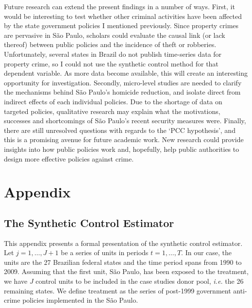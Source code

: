 Future research can extend the present findings in a number of ways. First, it would be interesting to test whether other criminal activities have been affected by the state government policies I mentioned previously. Since property crimes are pervasive in São Paulo, scholars could evaluate the causal link (or lack thereof) between public policies and the incidence of theft or robberies. Unfortunately, several states in Brazil do not publish time-series data for property crime, so I could not use the synthetic control method for that dependent variable. As more data become available, this will create an interesting opportunity for investigation. Secondly, micro-level studies are needed to clarify the mechanisms behind São Paulo's homicide reduction, and isolate direct from indirect effects of each individual policies. Due to the shortage of data on targeted policies, qualitative research may explain what the motivations, successes and shortcomings of São Paulo's recent security measures were. Finally, there are still unresolved questions with regards to the `PCC hypothesis', and this is a promising avenue for future academic work. New research could provide insights into how public policies work and, hopefully, help public authorities to design more effective policies against crime.

\section{Appendix} 
\label{sec:synth-appendix}

\subsection{The Synthetic Control Estimator}
\label{sec:synth-estimator}

This appendix presents a formal presentation of the synthetic control estimator. Let $j = 1, \dots, J + 1$ be a series of units in periods $t = 1, \dots, T$. In our case, the units are the 27 Brazilian federal states and the time period spans from 1990 to 2009. Assuming that the first unit, São Paulo, has been exposed to the treatment, we have $J$ control units to be included in the case studies donor pool, \emph{i.e.} the 26 remaining states. We define treatment as the series of post-1999 government anti-crime policies implemented in the São Paulo.

